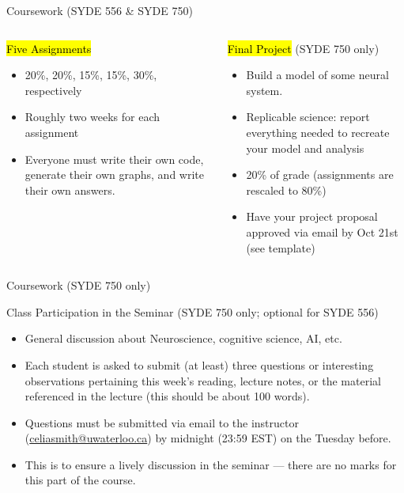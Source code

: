 \documentclass[aspectratio=169]{beamer}
\begin{document}
\begin{frame}{Coursework (SYDE 556 \& SYDE 750)}
	\begin{columns}[t]
		\begin{block}{\hl{Five Assignments}}
		\begin{itemize}
				\item 20\%, 20\%, 15\%, 15\%, 30\%, respectively
				\item Roughly two weeks for each assignment
				\item Everyone must write their own code, generate their own graphs, and write their own answers.
			\end{itemize}
		\end{block}
		\begin{block}{\hl{Final Project} (SYDE 750 only)}
			\begin{itemize}
				\item Build a model of some neural system.
				\item Replicable science: report everything needed to recreate your model and analysis
				\item 20\% of grade (assignments are rescaled to 80\%)
				\item Have your project proposal approved via email by Oct 21st (see template)
			\end{itemize}
		\end{block}
	\end{columns}
\end{frame}

\begin{frame}{Coursework (SYDE 750 only)}
	\begin{block}{Class Participation in the Seminar  (SYDE 750 only; optional for SYDE 556)}
	\begin{itemize}
		\item General discussion about Neuroscience, cognitive science, AI, etc.
		\item Each student is asked to submit (at least) three questions or interesting observations pertaining this week's reading, lecture notes, or the material referenced in the lecture (this should be about 100 words).
		\item Questions must be submitted via email to the instructor (\url{celiasmith@uwaterloo.ca}) by midnight (23:59 EST) on the Tuesday before.
    \item This is to ensure a lively discussion in the seminar --- there are no marks for this part of the course.
  \end{itemize}
	\end{block}
\end{frame}
\end{document}
